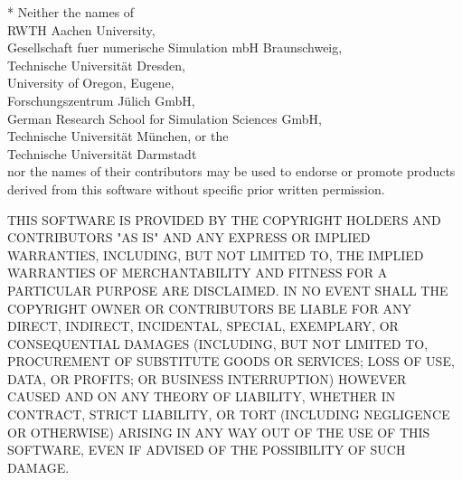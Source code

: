 {* Neither the names of \\ \hspace*{10mm}
   RWTH Aachen University, \\ \hspace*{10mm}
   Gesellschaft fuer numerische Simulation mbH Braunschweig, \\ \hspace*{10mm}
   Technische Universit\"{a}t Dresden, \\ \hspace*{10mm}
   University of Oregon, Eugene, \\ \hspace*{10mm}
   Forschungszentrum J\"{u}lich GmbH, \\ \hspace*{10mm}
   German Research School for Simulation Sciences GmbH, \\ \hspace*{10mm}
   Technische Universit\"{a}t M\"{u}nchen, or the \\ \hspace*{10mm}
   Technische Universit\"{a}t Darmstadt \\
  nor the names of their contributors may be used to endorse or promote
  products derived from this software without specific prior written
  permission.

THIS SOFTWARE IS PROVIDED BY THE COPYRIGHT HOLDERS AND CONTRIBUTORS
"AS IS" AND ANY EXPRESS OR IMPLIED WARRANTIES, INCLUDING, BUT NOT
LIMITED TO, THE IMPLIED WARRANTIES OF MERCHANTABILITY AND FITNESS FOR
A PARTICULAR PURPOSE ARE DISCLAIMED. IN NO EVENT SHALL THE COPYRIGHT
OWNER OR CONTRIBUTORS BE LIABLE FOR ANY DIRECT, INDIRECT, INCIDENTAL,
SPECIAL, EXEMPLARY, OR CONSEQUENTIAL DAMAGES (INCLUDING, BUT NOT
LIMITED TO, PROCUREMENT OF SUBSTITUTE GOODS OR SERVICES; LOSS OF USE,
DATA, OR PROFITS; OR BUSINESS INTERRUPTION) HOWEVER CAUSED AND ON ANY
THEORY OF LIABILITY, WHETHER IN CONTRACT, STRICT LIABILITY, OR TORT
(INCLUDING NEGLIGENCE OR OTHERWISE) ARISING IN ANY WAY OUT OF THE USE
OF THIS SOFTWARE, EVEN IF ADVISED OF THE POSSIBILITY OF SUCH DAMAGE.
}
